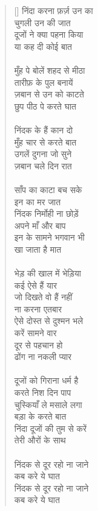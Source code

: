 \begin{verse}[\versewidth]\texthindi{
निंदा करना फ़र्ज़ उन का \\
चुगली उन की जात\\
दूजों ने क्या पहना किया\\
या कह दी कोई बात\\
\\
मुँह पे बोलें शहद से मीठा \\
तारीफ़ के पुल बनायें\\
ज़बान से उन को काटते\\
 छुप पीठ पे करते घात\\
\\
निंदक के हैं कान दो\\
 मुँह चार से करते बात\\
उगलें दुगना जो सुने \\
ज़बान चले दिन रात\\
\\
साँप का काटा बच सके\\
 इन का मर जात\\
निंदक निर्मोही ना छोड़ें \\
अपने माँ और बाप\\
इन के सामने भगवान भी \\
खा जाता है मात\\
\\
भेड़ की खाल में भेड़िया\\
 कई ऐसे हैं यार\\
जो दिखते वो हैं नहीं\\
 ना करना एतबार\\
ऐसे दोस्त से दुश्मन भले\\
 करें सामने वार\\
दूर से पहचान हो \\
ढोंग ना नकली प्यार\\
\\
दूजों को गिराना धर्म है \\
करते निश दिन पाप\\
चुस्कियाँ ले मसाले लगा \\
बड़ा के करते बात\\
निंदा दूजों की तुम से करें\\
 तेरी औरों के साथ\\
\\
निंदक से दूर रहो ना जाने \\
कब करे ये घात\\
निंदक से दूर रहो ना जाने \\
कब करे ये घात
}
\end{verse}


